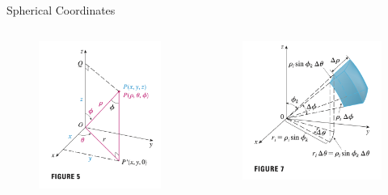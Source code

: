\documentclass[aspectratio=169, UTF8]{beamer}
\begin{document}
\begin{frame}{Spherical Coordinates}
\begin{columns}
    \begin{column}{0.35\textwidth}
        \begin{figure}
            \centering
            \includegraphics[width=0.8\linewidth]{sc_1.png}
        \end{figure}
    \end{column}
    \begin{column}{0.35\textwidth}
        \begin{figure}
            \centering
            \includegraphics[width=0.8\linewidth]{sc_2.png}
        \end{figure}
    \end{column}
\end{columns}

\end{frame}
\end{document}
